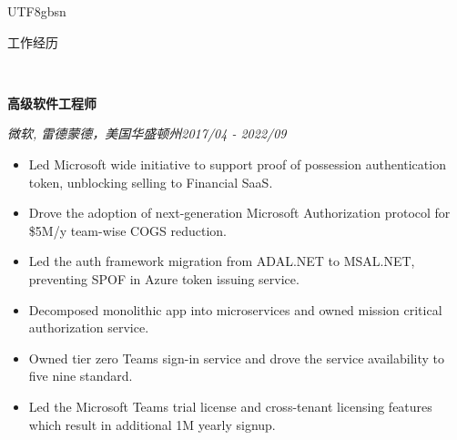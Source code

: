 \documentclass[3pt]{article}
\newenvironment{changemargin}[2]{%
  \begin{list}{}{%
    \setlength{\topsep}{0pt}%
    \setlength{\leftmargin}{#1}%
    \setlength{\rightmargin}{#2}%
    \setlength{\listparindent}{\parindent}%
    \setlength{\itemindent}{\parindent}%
    \setlength{\parsep}{\parskip}%
  }%
  \item[]}{\end{list}
}
\newcommand{\lineover}{
	\begin{changemargin}{-0.05in}{-0.05in}
		\vspace*{-8pt}
		\hrulefill \\
		\vspace*{-2pt}
	\end{changemargin}
}
\newcommand{\header}[1]{
	\begin{changemargin}{-0.5in}{-0.5in}
		{\Large \scshape{#1}}\\
  	\lineover
	\end{changemargin}
}
\newcommand{\contact}[4]{
	\begin{changemargin}{-0.5in}{-0.5in}
		\begin{center}
			{\Large \scshape {#1}}\\ \smallskip
			{#2}\\ \smallskip
			{#3}\\ \smallskip
			{#4}\smallskip
		\end{center}
	\end{changemargin}
}
\newenvironment{body} {
	\vspace*{-16pt}
	\begin{changemargin}{-0.25in}{-0.5in}
  }	
	{\end{changemargin}
}
\begin{document}
\begin{CJK}{UTF8}{gbsn}





\bigskip


\header{工作经历}

\begin{body}
	\vspace{17pt}
	
   \textbf{高级软件工程师} \\
   \vspace{1pt}

    \emph{微软, 雷德蒙德，美国华盛顿州}\hfill \emph{2017/04 - 2022/09}\\
     \begin{itemize} \itemsep -0.5pt
    \item {Led Microsoft wide initiative to support proof of possession authentication token, unblocking selling to Financial SaaS.}
    \item {Drove the adoption of next-generation Microsoft Authorization protocol for \$5M/y team-wise COGS reduction.}
    \item {Led the auth framework migration from ADAL.NET to MSAL.NET,  preventing SPOF in Azure token issuing service.}
    \item {Decomposed monolithic app into microservices and owned mission critical authorization service.}
    \item {Owned tier zero Teams sign-in service and drove the service availability to five nine standard.}
     \item {Led the Microsoft Teams trial license and cross-tenant licensing features which result in additional 1M yearly signup.}
     \end{itemize}


\end{body}
\end{CJK}
\end{document}
